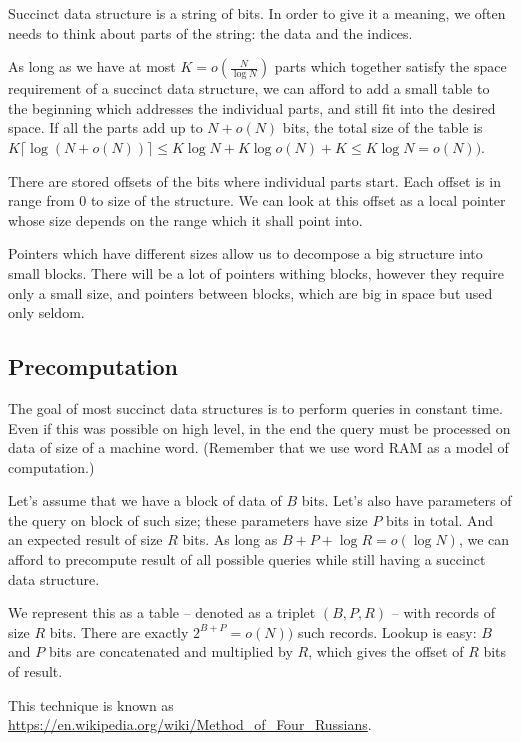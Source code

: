 Succinct data structure is a string of bits.
In order to give it a meaning, we often needs to think about parts of the string: the data and the indices.

As long as we have at most $K = o(\frac{N}{\log N})$ parts which together satisfy the space requirement of a succinct data structure, we can afford to add a small table to the beginning which addresses the individual parts, and still fit into the desired space.
If all the parts add up to $N + o(N)$ bits, the total size of the table is $K \lceil \log (N + o(N)) \rceil \le K \log N + K \log o(N) + K \le K \log N = o(N))$.

There are stored offsets of the bits where individual parts start.
Each offset is in range from $0$ to size of the structure.
We can look at this offset as a local pointer whose size depends on the range which it shall point into.

Pointers which have different sizes allow us to decompose a big structure into small blocks.
There will be a lot of pointers withing blocks, however they require only a small size, and pointers between blocks, which are big in space but used only seldom.

\subsection{Precomputation}

The goal of most succinct data structures is to perform queries in constant time.
Even if this was possible on high level, in the end the query must be processed on data of size of a machine word.
(Remember that we use word RAM as a model of computation.)

Let's assume that we have a block of data of $B$ bits.
Let's also have parameters of the query on block of such size; these parameters have size $P$ bits in total.
And an expected result of size $R$ bits.
As long as $B+P+\log R = o(\log N)$, we can afford to precompute result of all possible queries while still having a succinct data structure.

We represent this as a table -- denoted as a triplet $(B, P, R)$ -- with records of size $R$ bits.
There are exactly $2^{B+P} = o(N))$ such records.
Lookup is easy: $B$ and $P$ bits are concatenated and multiplied by $R$, which gives the offset of $R$ bits of result.

This technique is known as \url{https://en.wikipedia.org/wiki/Method_of_Four_Russians}.

